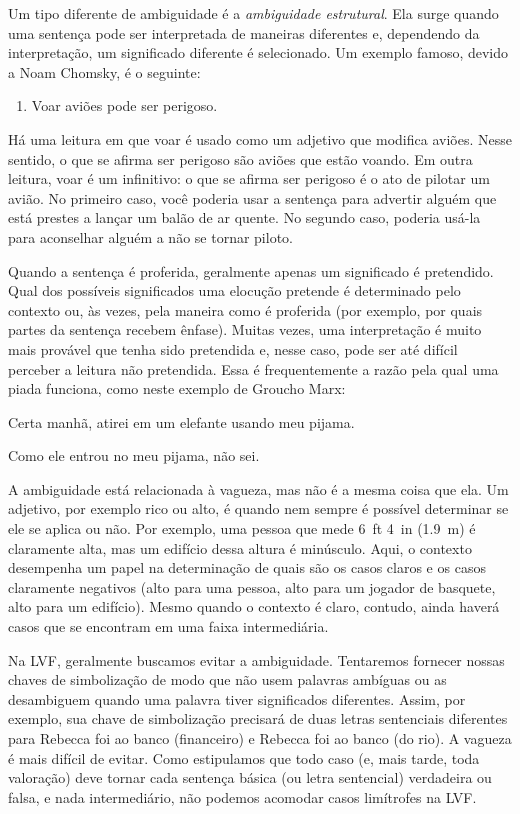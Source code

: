 Um tipo diferente de ambiguidade é a \emph{ambiguidade estrutural}. Ela
surge quando uma sentença pode ser interpretada de maneiras diferentes
e, dependendo da interpretação, um significado diferente é selecionado.
Um exemplo famoso, devido a Noam Chomsky, é o seguinte:
\begin{enumerate}
	\item[] Voar aviões pode ser perigoso.
\end{enumerate}
Há uma leitura em que voar é usado como um adjetivo que modifica
aviões. Nesse sentido, o que se afirma ser perigoso são aviões que
estão voando. Em outra leitura, voar é um infinitivo: o que se
afirma ser perigoso é o ato de pilotar um avião. No primeiro caso, você
poderia usar a sentença para advertir alguém que está prestes a lançar um
balão de ar quente. No segundo caso, poderia usá-la para aconselhar
alguém a não se tornar piloto.

Quando a sentença é proferida, geralmente apenas um significado é
pretendido. Qual dos possíveis significados uma elocução pretende é
determinado pelo contexto ou, às vezes, pela maneira como é proferida
(por exemplo, por quais partes da sentença recebem ênfase). Muitas vezes,
uma interpretação é muito mais provável que tenha sido pretendida e,
nesse caso, pode ser até difícil perceber a leitura não pretendida. Essa
é frequentemente a razão pela qual uma piada funciona, como neste exemplo
de Groucho Marx:
\begin{compactlist}
	\item[] Certa manhã, atirei em um elefante usando meu pijama.
	\item[] Como ele entrou no meu pijama, não sei.
\end{compactlist}

A ambiguidade está relacionada à vagueza, mas não é a mesma coisa que
ela. Um adjetivo, por exemplo rico ou alto, é
 quando nem sempre é possível determinar se ele se aplica ou
não. Por exemplo, uma pessoa que mede 6~ft 4~in (1.9~m) é claramente
alta, mas um edifício dessa altura é minúsculo. Aqui, o contexto
desempenha um papel na determinação de quais são os casos claros e os
casos claramente negativos (alto para uma pessoa, alto para
um jogador de basquete, alto para um edifício). Mesmo quando o
contexto é claro, contudo, ainda haverá casos que se encontram em uma
faixa intermediária.

Na LVF, geralmente buscamos evitar a ambiguidade. Tentaremos fornecer
nossas chaves de simbolização de modo que não usem palavras ambíguas ou
as desambiguem quando uma palavra tiver significados diferentes. Assim,
por exemplo, sua chave de simbolização precisará de duas letras
sentenciais diferentes para Rebecca foi ao banco (financeiro) e
Rebecca foi ao banco (do rio). A vagueza é mais difícil de evitar.
Como estipulamos que todo caso (e, mais tarde, toda valoração) deve tornar
cada sentença básica (ou letra sentencial) verdadeira ou falsa, e nada
intermediário, não podemos acomodar casos limítrofes na LVF.

